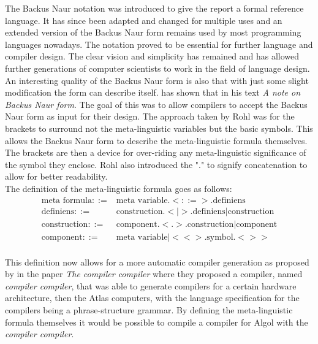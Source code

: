 \documentclass{article}
\begin{document}
The Backus Naur notation was introduced to give the report a formal reference language. It has since been adapted and changed for multiple uses and an extended version of the Backus Naur form remains used by most programming languages nowadays. The notation proved to be essential for further language and compiler design. The clear vision and simplicity has remained and has allowed further generations of computer scientists to work in the field of language design.
\\
An interesting quality of the Backus Naur form is also that with just some slight modification the form can describe itself. \citet{rohl1968note} has shown that in his text \textit{A note on Backus Naur form}. The goal of this was to allow compilers to accept the Backus Naur form as input for their design. The approach taken by Rohl was for the brackets to surround not the meta-linguistic variables but the basic symbols. This allows the Backus Naur form to describe the meta-linguistic formula themselves. The brackets are then a device for over-riding any meta-linguistic significance of the symbol they enclose. Rohl also introduced the "$.$" to signify concatenation to allow for better readability.
\\
The definition of the meta-linguistic formula goes as follows:
\begin{equation} \label{eq4}
\begin{split}
	\text{meta formula} ::=& \text{meta variable}.<::=>.\text{definiens} \\
	\text{definiens} ::=& \text{construction}.<|>.\text{definiens} | \text{construction} \\
	\text{construction} ::=& \text{component}.<.>.\text{construction} | \text{component} \\
	\text{component} ::=& \text{meta variable} | <<>.\text{symbol}.<>> \\
\end{split}
\end{equation}

This definition now allows for a more automatic compiler generation as proposed by \citet{brooker1963compiler} in the paper \textit{The compiler compiler} where they proposed a compiler, named \textit{compiler compiler}, that was able to generate compilers for a certain hardware architecture, then the Atlas computers, with the language specification for the compilers being a phrase-structure grammar. By defining the meta-linguistic formula themselves it would be possible to compile a compiler for Algol with the \textit{compiler compiler}.
\end{document}
